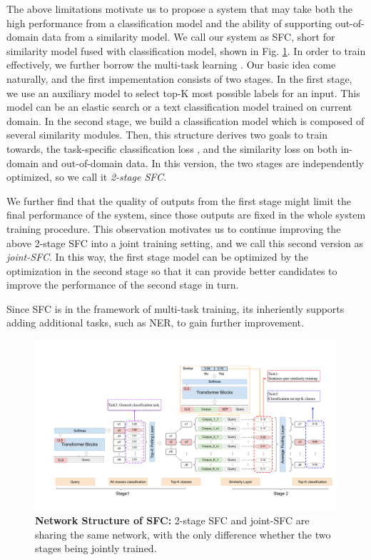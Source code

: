 The above limitations motivate us to propose a system that may take both the high performance from a classification model and the ability of supporting out-of-domain data from a similarity model.
We call our system as SFC, short for similarity model fused with classification model, shown in Fig. \ref{fig:framework}. 
In order to train effectively, we further borrow the multi-task learning \cite{caruana1993multitask,collobert2008unified, liu2019multi}.
Our basic idea come naturally, and the first impementation consists of two stages. 
In the first stage, we use an auxiliary model to select top-K most possible labels for an input. 
This model can be an elastic search \cite{divya2013elasticsearch} or a text classification model trained on current domain. 
In the second stage, we build a classification model which is composed of several similarity modules. 
Then, this structure derives two goals to train towards, the task-specific classification loss , and the similarity loss on both in-domain and out-of-domain data. 
In this version, the two stages are independently optimized, so we call it \emph{2-stage SFC}. 

We further find that the quality of outputs from the first stage might limit the final performance of the system, since those outputs are fixed in the whole system training procedure. 
This observation motivates us to continue improving the above 2-stage SFC into a joint training setting, and we call this second version as \emph{joint-SFC}. 
In this way, the first stage model can be optimized by the optimization in the second stage so that it can provide better candidates to improve the performance of the second stage in turn.

Since SFC is in the framework of multi-task training, its inheriently supports adding additional tasks, such as NER, to gain further improvement.

\begin{figure}[t]
  \begin{centering}
    \includegraphics[scale=0.66]{picture/picture4} 
    \par
  \end{centering}
  \caption{
    \textbf{Network Structure of SFC:} 2-stage SFC and joint-SFC are sharing the same network, with the only difference whether the two stages being jointly trained.
  }
  \label{fig:framework}
\end{figure}

